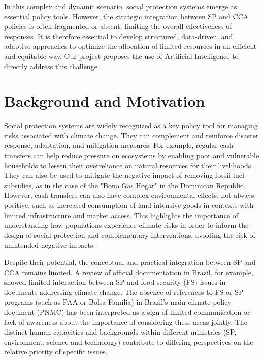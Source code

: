 \documentclass[letterpaper]{article}
\begin{document}
In this complex and dynamic scenario, social protection systems
emerge as essential policy tools. However, the strategic integration
between SP and CCA policies is often fragmented or absent, limiting
the overall effectiveness of responses. It is therefore essential
to develop structured, data-driven, and adaptive approaches to
optimize the allocation of limited resources in an efficient and
equitable way. Our project proposes the use of Artificial
Intelligence to directly address this challenge.

\section{Background and Motivation}
Social protection systems are widely recognized as a key policy tool
for managing risks associated with climate change. They can
complement and reinforce disaster response, adaptation, and
mitigation measures. For example, regular cash transfers can help
reduce pressure on ecosystems by enabling poor and vulnerable
households to lessen their overreliance on natural resources for
their livelihoods. They can also be used to mitigate the negative
impact of removing fossil fuel subsidies, as in the case of the
"Bono Gas Hogar" in the Dominican Republic. However, cash transfers
can also have complex environmental effects, not always positive,
such as increased consumption of land-intensive goods in contexts
with limited infrastructure and market access. This highlights the
importance of understanding how populations experience climate
risks in order to inform the design of social protection and
complementary interventions, avoiding the risk of unintended
negative impacts.

Despite their potential, the conceptual and practical integration
between SP and CCA remains limited. A review of official
documentation in Brazil, for example, showed limited interaction
between SP and food security (FS) issues in documents addressing
climate change. The absence of references to FS or SP programs
(such as PAA or Bolsa Família) in Brazil's main climate policy
document (PNMC) has been interpreted as a sign of limited
communication or lack of awareness about the importance of
considering these areas jointly. The distinct human capacities and
backgrounds within different ministries (SP, environment, science
and technology) contribute to differing perspectives on the
relative priority of specific issues.
\end{document}
